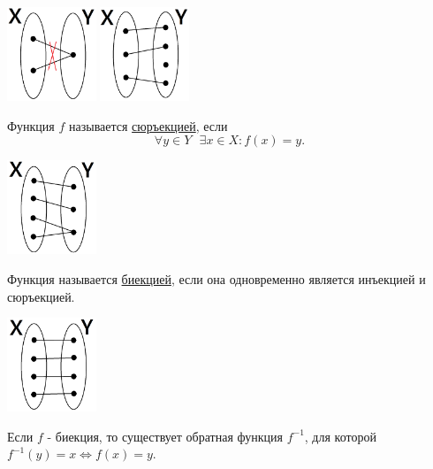 	\begin{center}
		\includegraphics[width=0.2\textwidth]{img/lecture1/injection1}
		\includegraphics[width=0.2\textwidth]{img/lecture1/injection2}
	\end{center}
	
	\begin{definition}
		Функция $f$ называется \underline{сюръекцией}, если
		\[ \forall y \in Y \text{ } \exists x \in X : f(x) = y. \]
	\end{definition}
	
	\begin{center}
		\includegraphics[width=0.2\textwidth]{img/lecture1/surjection}
	\end{center}
	
	\begin{definition}
		Функция называется \underline{биекцией}, если она одновременно является инъекцией и сюръекцией.
	\end{definition}
		
	\begin{center}
		\includegraphics[width=0.2\textwidth]{img/lecture1/bijection}
	\end{center}
	
	\begin{sentence}
		Если $f$ - биекция, то существует обратная функция $f^{-1}$, для которой $f^{-1}(y) = x \Leftrightarrow f(x) = y.$
	\end{sentence}
	
